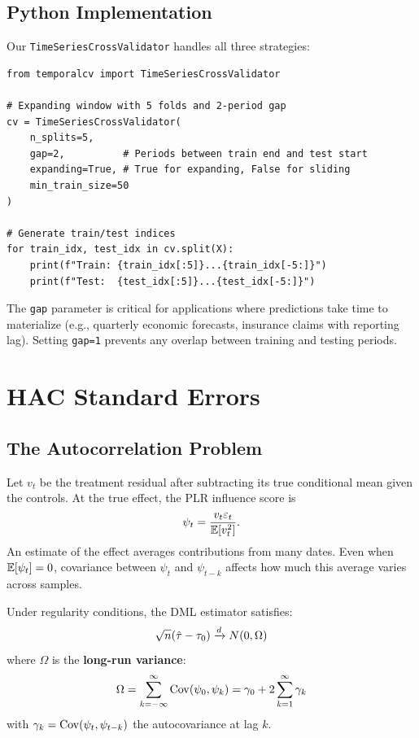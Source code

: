 \subsection{Python Implementation}

Our \texttt{TimeSeriesCrossValidator} handles all three strategies:

\begin{verbatim}
from temporalcv import TimeSeriesCrossValidator

# Expanding window with 5 folds and 2-period gap
cv = TimeSeriesCrossValidator(
    n_splits=5,
    gap=2,          # Periods between train end and test start
    expanding=True, # True for expanding, False for sliding
    min_train_size=50
)

# Generate train/test indices
for train_idx, test_idx in cv.split(X):
    print(f"Train: {train_idx[:5]}...{train_idx[-5:]}")
    print(f"Test:  {test_idx[:5]}...{test_idx[-5:]}")
\end{verbatim}

\begin{remark}
The \texttt{gap} parameter is critical for applications where predictions take time to materialize (e.g., quarterly economic forecasts, insurance claims with reporting lag). Setting \texttt{gap=1} prevents any overlap between training and testing periods.
\end{remark}

\section{HAC Standard Errors}\label{sec:hac_standard_errors}

\subsection{The Autocorrelation Problem}

Let $v_t$ be the treatment residual after subtracting its true conditional mean given the controls. At the true effect, the PLR influence score is
\[
\psi_t = \frac{v_t\varepsilon_t}{\mathbb{E}[v_t^2]}.
\]
An estimate of the effect averages contributions from many dates. Even when $\mathbb{E}[\psi_t]=0$, covariance between $\psi_t$ and $\psi_{t-k}$ affects how much this average varies across samples.

\begin{theorem}
\label{thm:hac_variance}
Under regularity conditions, the DML estimator satisfies:
\[
\sqrt{n}(\hat{\tau} - \tau_0) \xrightarrow{d} N(0, \Omega)
\]
where $\Omega$ is the \textbf{long-run variance}:
\begin{equation}
\Omega = \sum_{k=-\infty}^{\infty} \mathrm{Cov}(\psi_0, \psi_k) = \gamma_0 + 2\sum_{k=1}^{\infty} \gamma_k
\end{equation}
with $\gamma_k = \mathrm{Cov}(\psi_t, \psi_{t-k})$ the autocovariance at lag $k$.
\end{theorem}

